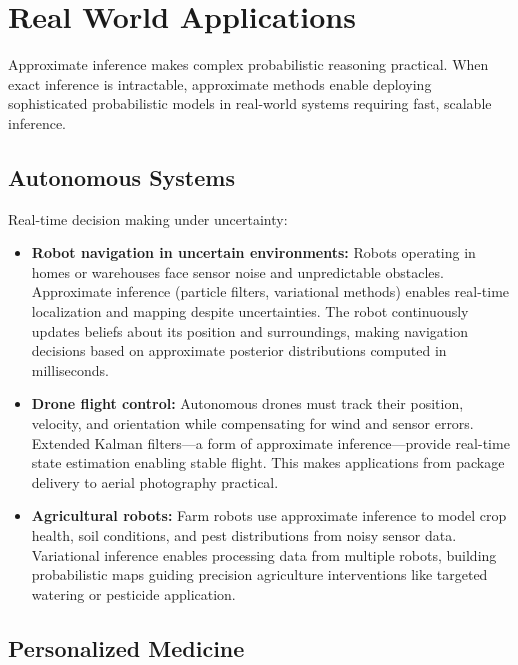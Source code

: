 
\section{Real World Applications}
\label{sec:approx-inference-real-world}

Approximate inference makes complex probabilistic reasoning practical. When exact inference is intractable, approximate methods enable deploying sophisticated probabilistic models in real-world systems requiring fast, scalable inference.

\subsection{Autonomous Systems}

Real-time decision making under uncertainty:

\begin{itemize}
    \item \textbf{Robot navigation in uncertain environments:} Robots operating in homes or warehouses face sensor noise and unpredictable obstacles. Approximate inference (particle filters, variational methods) enables real-time localization and mapping despite uncertainties. The robot continuously updates beliefs about its position and surroundings, making navigation decisions based on approximate posterior distributions computed in milliseconds.
    
    \item \textbf{Drone flight control:} Autonomous drones must track their position, velocity, and orientation while compensating for wind and sensor errors. Extended Kalman filters—a form of approximate inference—provide real-time state estimation enabling stable flight. This makes applications from package delivery to aerial photography practical.
    
    \item \textbf{Agricultural robots:} Farm robots use approximate inference to model crop health, soil conditions, and pest distributions from noisy sensor data. Variational inference enables processing data from multiple robots, building probabilistic maps guiding precision agriculture interventions like targeted watering or pesticide application.
\end{itemize}

\subsection{Personalized Medicine}

